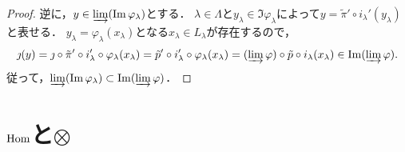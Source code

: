 \begin{proof}
  逆に，$y \in \varinjlim (\Im \varphi_\lambda)$とする．
  $\lambda \in \Lambda$と$y_\lambda \in \Im \varphi_\lambda$によって$y = \tilde{\pi}' \circ i_\lambda' (y_\lambda)$と表せる．
  $y_\lambda = \varphi_\lambda (x_\lambda)$となる$x_\lambda \in L_\lambda$が存在するので，
  \[\jmath (y) = \jmath \circ \tilde{\pi}' \circ i_\lambda' \circ \varphi_\lambda (x_\lambda) = \tilde{p}' \circ i_\lambda' \circ \varphi_\lambda (x_\lambda) = (\varinjlim \varphi) \circ \tilde{p} \circ i_\lambda (x_\lambda) \in \Im (\varinjlim \varphi).\]
  従って，$\varinjlim (\Im \varphi_\lambda) \subset \Im (\varinjlim \varphi)$．
\end{proof}

\section{$\Hom$と$\otimes$}

